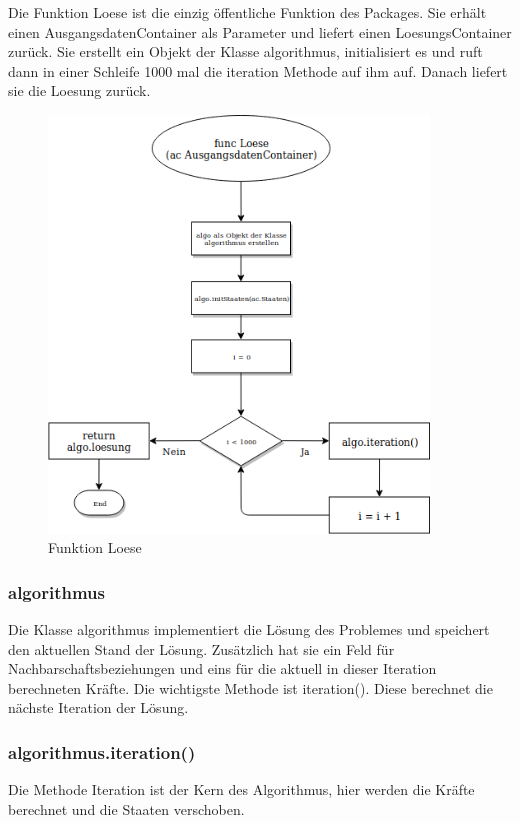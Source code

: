 Die Funktion Loese ist die einzig öffentliche Funktion des Packages.
Sie erhält einen AusgangsdatenContainer als Parameter und liefert einen LoesungsContainer zurück.
Sie erstellt ein Objekt der Klasse algorithmus, initialisiert es und ruft dann in einer Schleife 1000 mal die iteration Methode auf ihm auf.
Danach liefert sie die Loesung zurück.

\begin{figure}[h!]
    \centering
    \includegraphics[width=0.9\textwidth,]{Loese.png}
    \caption[]{Funktion Loese}
\end{figure}

\FloatBarrier

\subsubsection{algorithmus}

Die Klasse algorithmus implementiert die Lösung des Problemes und speichert den aktuellen Stand der Lösung.
Zusätzlich hat sie ein Feld für Nachbarschaftsbeziehungen und eins für die aktuell in dieser Iteration berechneten Kräfte.
Die wichtigste Methode ist iteration(). Diese berechnet die nächste Iteration der Lösung.

\subsubsection{algorithmus.iteration()}
Die Methode Iteration ist der Kern des Algorithmus, hier werden die Kräfte berechnet und die Staaten verschoben.

